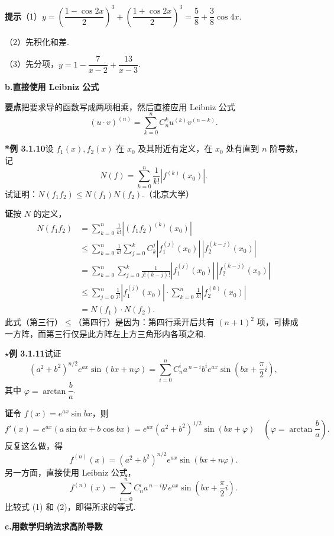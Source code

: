 \documentclass[UTF8,12pt,a4paper,fontset=fandol]{ctexart}
\begin{document}
\noindent\textbf{提示}\quad （1）$y=\left(\dfrac{1-\cos2x}{2}\right)^3+\left(\dfrac{1+\cos2x}{2}\right)^3=\dfrac58+\dfrac38\cos4x$.

（2）先积化和差.

（3）先分项，$y=1-\dfrac7{x-2}+\dfrac{13}{x-3}$.

\noindent\textbf{b.\quad 直接使用 Leibniz 公式}

\noindent\textbf{要点}\quad 把要求导的函数写成两项相乘，然后直接应用 Leibniz 公式
\[
  (u\cdot v)^{(n)}=\sum_{k=0}^n C_n^k u^{(k)}v^{(n-k)}.
\]

\noindent\textbf{*例 3.1.10}\quad 设 $f_1(x),f_2(x)$ 在 $x_0$ 及其附近有定义，在 $x_0$ 处有直到 $n$ 阶导数，记
\[
  N(f)=\sum_{k=0}^n\frac1{k!}|f^{(k)}(x_0)|.
\]
试证明：$N(f_1f_2)\le N(f_1)N(f_2)$.（北京大学）

\noindent\textbf{证}\quad 按 $N$ 的定义，
\[
\begin{aligned}
N(f_1f_2)
&=\sum_{k=0}^n\frac1{k!}|(f_1f_2)^{(k)}(x_0)|\\
&\le\sum_{k=0}^n\frac1{k!}\sum_{j=0}^k C_k^j
|f_1^{(j)}(x_0)|\,|f_2^{(k-j)}(x_0)|\\
&=\sum_{k=0}^n\sum_{j=0}^k
\frac1{j!(k-j)!}|f_1^{(j)}(x_0)|\,|f_2^{(k-j)}(x_0)|\\
&\le\sum_{j=0}^n\frac1{j!}|f_1^{(j)}(x_0)|
\cdot\sum_{k=0}^n\frac1{k!}|f_2^{(k)}(x_0)|\\
&=N(f_1)\cdot N(f_2).
\end{aligned}
\]
此式（第三行）$\le$（第四行）是因为：第四行乘开后共有 $(n+1)^2$ 项，可排成一方阵，而第三行仅是此方阵左上方三角形内各项之和.

\noindent\textbf{$\star$例 3.1.11}\quad 试证
\[
  (a^2+b^2)^{n/2}e^{ax}\sin(bx+n\varphi)
  =\sum_{i=0}^n C_n^i a^{\,n-i}b^i e^{ax}\sin\left(bx+\frac\pi2 i\right),
\]
其中 $\varphi=\arctan\dfrac ba$.

\noindent\textbf{证}\quad 令 $f(x)=e^{ax}\sin bx$，则
\[
  f'(x)=e^{ax}(a\sin bx+b\cos bx)
  =e^{ax}(a^2+b^2)^{1/2}\sin(bx+\varphi)
  \quad\left(\varphi=\arctan\frac ba\right).
\]
反复这么做，得
\begin{equation}
  f^{(n)}(x)=(a^2+b^2)^{n/2}e^{ax}\sin(bx+n\varphi).
\tag{1}
\end{equation}
另一方面，直接使用 Leibniz 公式，
\begin{equation}
  f^{(n)}(x)=\sum_{i=0}^n C_n^i a^{\,n-i}b^i e^{ax}\sin\left(bx+\frac\pi2 i\right).
\tag{2}
\end{equation}
比较式 (1) 和 (2)，即得所求的等式.

\noindent\textbf{c.\quad 用数学归纳法求高阶导数}
\end{document}
